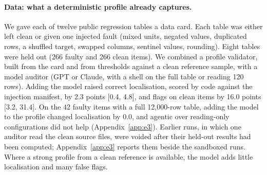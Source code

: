 \paragraph{Data: what a deterministic profile already captures.} We gave each of twelve public regression tables a
data card. Each table was either left clean or given one injected fault (mixed units, negated values, duplicated
rows, a shuffled target, swapped columns, sentinel values, rounding). Eight tables were held out (266 faulty and 266
clean items). We combined a profile validator, built from the card and from thresholds against a clean reference sample, with a model auditor (GPT or Claude, with a shell on the full table or reading 120 rows).
Adding the model raised correct localisation, scored by code against the injection manifest, by 2.3 points
[0.4, 4.8], and flags on clean items by 16.0 points [3.2, 31.4]. On the 42 faulty items with a full 12{,}000-row table, adding the model
to the profile changed localisation by 0.0, and agentic over reading-only configurations did not help (Appendix~\ref{app:e3}). Earlier runs, in which one auditor read the clean source files, were voided after their held-out results
had been computed; Appendix~\ref{app:e3} reports them beside the sandboxed runs. Where a strong profile from a clean reference is available,
the model adds little localisation and many false flags.
